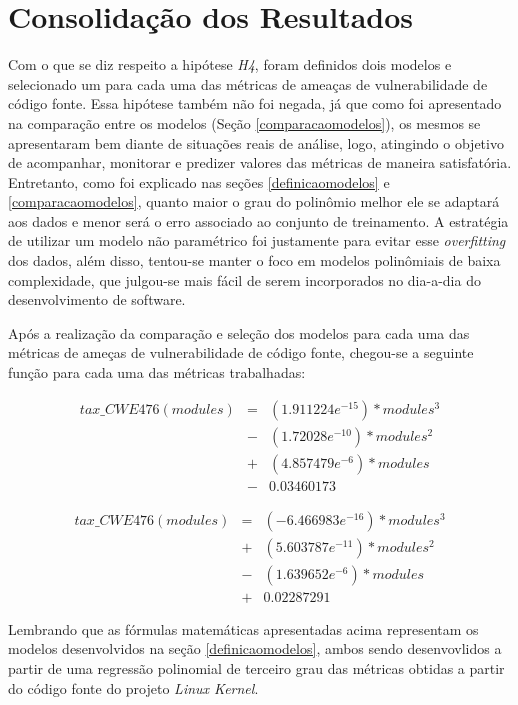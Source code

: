 \section{Consolidação dos Resultados}

Com o que se diz respeito a hipótese \textit{H4}, foram definidos dois modelos e
selecionado um para cada uma das métricas de ameaças de vulnerabilidade de
código fonte. Essa hipótese também não foi negada, já que como foi apresentado
na comparação entre os modelos (Seção \ref{comparacaomodelos}), os mesmos se
apresentaram bem diante de situações reais de análise, logo, atingindo o
objetivo de acompanhar, monitorar e predizer valores das métricas de maneira
satisfatória. Entretanto, como foi explicado nas seções \ref{definicaomodelos} e
\ref{comparacaomodelos}, quanto maior o grau do polinômio melhor ele se adaptará
aos dados e menor será o erro associado ao conjunto de treinamento. A estratégia
de utilizar um modelo não paramétrico foi justamente para evitar esse
\textit{overfitting} dos dados, além disso, tentou-se manter o foco em modelos
polinômiais de baixa complexidade, que julgou-se mais fácil de serem
incorporados no dia-a-dia do desenvolvimento de software.

Após a realização da comparação e seleção dos modelos para cada uma das métricas
de ameças de vulnerabilidade de código fonte, chegou-se a seguinte função para
cada uma das métricas trabalhadas:

\begin{align*}
 tax\_CWE476(modules) &=& (1.911224e^{-15}) * modules^{3} \\
                      &-& (1.72028e^{-10}) * modules^{2} \\
                      &+& (4.857479e^{-6}) * modules \\
                      &-& 0.03460173
\end{align*}

\begin{align*}
 tax\_CWE476(modules) &=& (-6.466983e^{-16}) * modules^{3} \\
                      &+& (5.603787e^{-11}) * modules^{2} \\
                      &-& (1.639652e^{-6}) * modules \\
                      &+& 0.02287291
\end{align*}

Lembrando que as fórmulas matemáticas apresentadas acima representam os modelos
desenvolvidos na seção \ref{definicaomodelos}, ambos sendo desenvovlidos a
partir de uma regressão polinomial de terceiro grau das métricas obtidas a
partir do código fonte do projeto \textit{Linux Kernel}.

